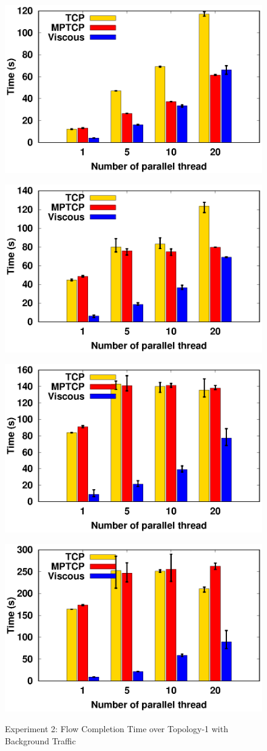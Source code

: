 \begin{figure}[!t]
    \begin{center}
        \begin{minipage}{0.45\linewidth}
            \centering
            \includegraphics[width=0.24\linewidth]{img/exp7/time_elapsed_1}
            \label{fig:exp7_time_16}
        \end{minipage}
        \begin{minipage}{0.45\linewidth}
            \centering
            \includegraphics[width=0.24\linewidth]{img/exp7/time_elapsed_5}
            \label{fig:exp7_time_80}
        \end{minipage}
        \begin{minipage}{0.45\linewidth}
            \centering
            \includegraphics[width=0.24\linewidth]{img/exp7/time_elapsed_10}
            \label{fig:exp7_time_160}
        \end{minipage}
        \begin{minipage}{0.45\linewidth}
            \centering
            \includegraphics[width=0.24\linewidth]{img/exp7/time_elapsed_20}
            \label{fig:exp7_time_320}
        \end{minipage}
        \caption{\label{fig:exp7_time}Experiment 2: Flow Completion Time over Topology-1 with Background Traffic}
    \end{center}
\end{figure}

